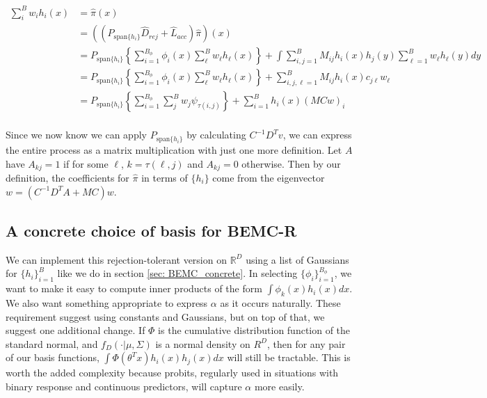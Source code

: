 \documentclass{article}
\begin{document}
\begin{align*}
\sum_{i}^{B}w_{i}h_i(x)&=\hat{\pi}(x) \\
&=((P_{\text{span}\{h_i\}}\hat{D}_{rej} + 
\hat{L}_{acc})\hat{\pi})(x) 
\\
&=  P_{\text{span}\{h_i\}}\left\{\sum_{i=1}^{B_\phi} \phi_i(x) \sum_{\ell}^{B}w_{\ell}h_\ell(x)\right\} + 
\int \sum_{i,j=1}^B M_{ij} h_i(x)h_j(y) \sum_{\ell=1}^{B}w_{\ell}h_\ell(y)dy
\\
&=  P_{\text{span}\{h_i\}}\left\{\sum_{i=1}^{B_\phi} \phi_i(x) \sum_{\ell}^{B}w_{\ell}h_\ell(x)\right\} + 
 \sum_{i,j, \ell=1}^B M_{ij} h_i(x)c_{j\ell}w_{\ell}
\\
&=  P_{\text{span}\{h_i\}}\left\{\sum_{i=1}^{B_\phi} \sum_{j}^{B}w_{j} \psi_{\tau(i,j)}\right\}+ 
 \sum_{i=1}^B h_i(x)(MCw)_{i}\\
\end{align*}

Since we now know we can apply $ P_{\text{span}\{h_i\}}$ by calculating $C^{-1}D^Tv$, we can express the entire process as a matrix multiplication with just one more definition. Let $A$ have $A_{kj}=1$ if for some $\ell$, $k=\tau(\ell, j)$ and $A_{kj}=0$ otherwise. Then by our definition, the coefficients for $\hat{\pi}$ in terms of $\{h_i\}$ come from the eigenvector $w = (C^{-1}D^TA + MC)w$.

\subsection{A concrete choice of basis for BEMC-R}
\label{sec: BEMC-R_concrete}

We can implement this rejection-tolerant version on $\mathbb{R}^D$ using a list of Gaussians for $\{h_i\}_{i=1}^B$ like we do in section \ref{sec: BEMC_concrete}. In selecting $\{\phi_i\}_{i=1}^{B_\phi}$, we want to make it easy to compute inner products of the form $\int \phi_k(x)h_i(x)dx$. We also want something appropriate to express $\alpha$ as it occurs naturally. These requirement suggest using constants and Gaussians, but on top of that, we suggest one additional change. If $\Phi$ is the cumulative distribution function of the standard normal, and $f_D(\cdot|\mu, \Sigma)$ is a normal density on $R^D$, then for any pair of our basis functions, $\int \Phi(\theta ^T x)h_i(x)h_j(x)dx$ will still be tractable. This is worth the added complexity because probits, regularly used in situations with binary response and continuous predictors, will capture $\alpha$ more easily. 
\end{document}
